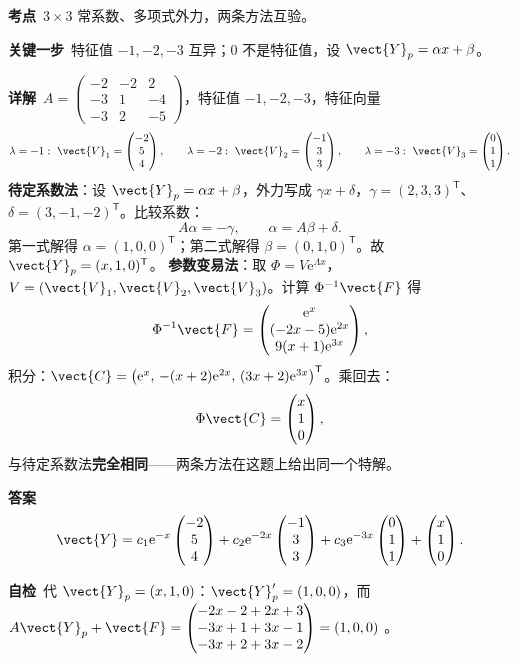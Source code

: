 \documentclass[11pt]{ctexart}
\renewcommand{\qbreak}{\needspace{0.26\textheight}}
\newcommand{\qpagebreak}{\needspace{0.92\textheight}}
\newcommand{\mat}[1]{\begin{pmatrix}#1\end{pmatrix}}
\begin{document}
\qpagebreak
{}
\label{c4:app:hw}
\qbreak
{}
\par\textbf{考点}\ $3\times3$ 常系数、多项式外力，两条方法互验。
\par\textbf{关键一步}\ 特征值 $-1,-2,-3$ 互异；$0$ 不是特征值，设 $\vect{Y}_p=\alpha x+\beta$。
\par\textbf{详解}\ $A=\mat{-2&-2&2\\-3&1&-4\\-3&2&-5}$，特征值 $-1,-2,-3$，特征向量
\[
\lambda=-1:\ \vect{V}_1=\mat{-2\\5\\4},\qquad \lambda=-2:\ \vect{V}_2=\mat{-1\\3\\3},\qquad \lambda=-3:\ \vect{V}_3=\mat{0\\1\\1}.
\]
\textbf{待定系数法}：设 $\vect{Y}_p=\alpha x+\beta$，外力写成 $\gamma x+\delta$，$\gamma=(2,3,3)^{\mathsf T}$、$\delta=(3,-1,-2)^{\mathsf T}$。比较系数：
\[
A\alpha=-\gamma,\qquad \alpha=A\beta+\delta .
\]
第一式解得 $\alpha=(1,0,0)^{\mathsf T}$；第二式解得 $\beta=(0,1,0)^{\mathsf T}$。故 $\vect{Y}_p=(x,1,0)^{\mathsf T}$。
\textbf{参数变易法}：取 $\Phi=V\mathrm{e}^{\Lambda x}$，$V=(\vect{V}_1,\vect{V}_2,\vect{V}_3)$。计算 $\Phi^{-1}\vect{F}$ 得
\[
\Phi^{-1}\vect{F}=\mat{\mathrm{e}^{x}\\(-2x-5)\mathrm{e}^{2x}\\9(x+1)\mathrm{e}^{3x}},
\]
积分：$\vect{C}=\bigl(\mathrm{e}^x,\,-(x+2)\mathrm{e}^{2x},\,(3x+2)\mathrm{e}^{3x}\bigr)^{\mathsf T}$。乘回去：
\[
\Phi\vect{C}=\mat{x\\1\\0},
\]
与待定系数法\textbf{完全相同}——两条方法在这题上给出同一个特解。
\par\textbf{答案}\
\[
\vect{Y}=c_1\mathrm{e}^{-x}\mat{-2\\5\\4}+c_2\mathrm{e}^{-2x}\mat{-1\\3\\3}+c_3\mathrm{e}^{-3x}\mat{0\\1\\1}+\mat{x\\1\\0}.
\]
\par\textbf{自检}\ 代 $\vect{Y}_p=(x,1,0)$：$\vect{Y}_p'=(1,0,0)$，而 $A\vect{Y}_p+\vect{F}=\mat{-2x-2+2x+3\\-3x+1+3x-1\\-3x+2+3x-2}=(1,0,0)$ 。
\end{document}
